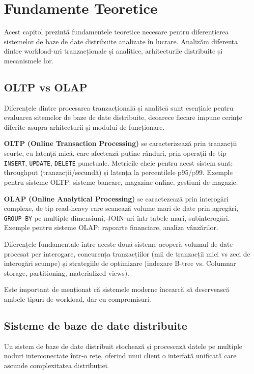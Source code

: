 \chapter{Fundamente Teoretice}

Acest capitol prezintă fundamentele teoretice necesare pentru diferențierea sistemelor de baze de date distribuite analizate în lucrare. Analizăm diferența dintre workload-uri tranzacționale și analitice, arhitecturile distribuite și mecanismele lor.

\section{OLTP vs OLAP}

Diferențele dintre procesarea tranzacțională și analitcă sunt esențiale pentru evaluarea sitemelor de baze de date distribuite, deoarece fiecare impune cerințe diferite asupra arhitecturii și modului de funcționare.

\textbf{OLTP (Online Transaction Processing)} se caracterizează prin tranzacții scurte, cu latență mică, care afectează puține rânduri, prin operații de tip \texttt{INSERT}, \texttt{UPDATE}, \texttt{DELETE} punctuale. Metricile cheie pentru acest sistem sunt: throughput (tranzacții/secundă) și latența la percentilele p95/p99. Exemple pentru sisteme OLTP: sisteme bancare, magazine online, gestiuni de magazie.

\textbf{OLAP (Online Analytical Processing)} se caractezează prin interogări complexe, de tip read-heavy care scanează volume mari de date prin agregări, \texttt{GROUP BY} pe multiple dimensiuni, JOIN-uri într tabele mari, subinterogări. Exemple pentru sisteme OLAP: rapoarte financiare, analiza vânzărilor.

Diferențele fundamentale între aceste două sisteme acoperă volumul de date procesat per interogare, concurența tranzacțiilor (mii de tranzacții mici vs zeci de interogări scumpe) și strategiile de optimizare (indexare B-tree vs. Columnar storage, partitioning, materialized views).

Este important de menționat că sistemele moderne încearcă să deservească ambele tipuri de workload, dar cu compromisuri.

\section{Sisteme de baze de date distribuite}

Un sistem de baze de date distribuit stochează și procesează datele pe multiple noduri interconectate într-o rețe, oferind unui client o interfată unificată care ascunde complexitatea distribuției.

